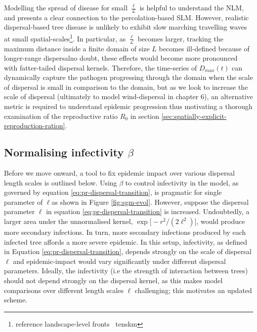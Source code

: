 Modelling the spread of disease for small $\frac{\ell}{\mathcal{L}}$ is helpful to understand the NLM, and presents a clear connection to the percolation-based SLM.
However, realistic dispersal-based tree disease is unlikely to exhibit slow marching travelling waves at small spatial-scales\footnote{reference landscape-level fronts ~tenskm}.
In particular, as $\frac{\ell}{\mathcal{L}}$ becomes larger, tracking the maximum distance inside a finite domain of size $L$ becomes ill-defined 
because of longer-range dispersal\textemdash no doubt, these effects would become more pronounced with fatter-tailed dispersal kernels.
Therefore, the time-series of $D_{max}(t)$ can dynamically capture the pathogen progressing through the domain when the scale of dispersal is small in comparison to the domain, but as we look to increase the scale of dispersal (ultimately to model wind-dispersal in chapter 6), an alternative metric is required to understand epidemic progression\textemdash
thus motivating a thorough examination of the reproductive ratio $R_0$ in section \ref{sec:spatially-explicit-reproduction-ration}.
\newpage 

\subsection{Normalising infectivity $\beta$}

Before we move onward, a tool to fix epidemic impact over various dispersal length scales is outlined below.
Using $\beta$ to control infectivity in the model, as governed by equation \ref{eq:pr-dispersal-transition}, is pragmatic for single parameter of $\ell$\textemdash as shown in Figure \ref{fig:sgm-evol}.
However, suppose the dispersal parameter $\ell$ in equation \ref{eq:pr-dispersal-transition} is increased. 
Undoubtedly, a larger area under the unnormalised kernel, $\exp\big[-r^2/(2\ell^2)\big]$, would produce more secondary infections.
In turn, more secondary infections produced by each infected tree affords a more severe epidemic.
In this setup, infectivity, as defined in Equation \ref{eq:pr-dispersal-transition}, depends strongly on the scale of dispersal $\ell$ and epidemic-impact would vary significantly under different dispersal parameters.
Ideally, the infectivity (i.e the strength of interaction between trees) should not depend strongly on the dispersal kernel, as this makes model comparisons over different length scales $\ell$ challenging;
this motivates an updated scheme.


